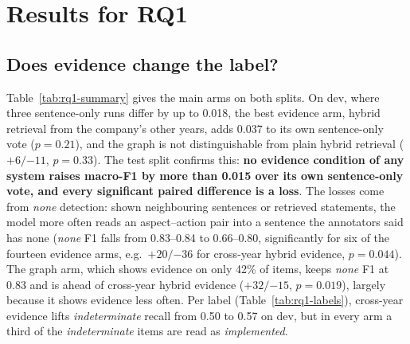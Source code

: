 \documentclass[11pt]{article}
\begin{document}
\section{Results for RQ1}
\label{sec:rq1}

\subsection{Does evidence change the label?}
\label{sec:rq1-main}
\label{sec:rq1-test}
Table~\ref{tab:rq1-summary} gives the main arms on both splits. On dev, where three sentence-only runs differ by up to 0.018, the best evidence arm, hybrid retrieval from the company's other years, adds 0.037 to its own sentence-only vote ($p = 0.21$), and the graph is not distinguishable from plain hybrid retrieval ($+6 / {-11}$, $p = 0.33$). The test split confirms this: \textbf{no evidence condition of any system raises macro-F1 by more than 0.015 over its own sentence-only vote, and every significant paired difference is a loss}. The losses come from \emph{none} detection: shown neighbouring sentences or retrieved statements, the model more often reads an aspect--action pair into a sentence the annotators said has none (\emph{none} F1 falls from 0.83--0.84 to 0.66--0.80, significantly for six of the fourteen evidence arms, e.g.\ $+20 / {-36}$ for cross-year hybrid evidence, $p = 0.044$). The graph arm, which shows evidence on only 42\% of items, keeps \emph{none} F1 at 0.83 and is ahead of cross-year hybrid evidence ($+32 / {-15}$, $p = 0.019$), largely because it shows evidence less often. Per label (Table~\ref{tab:rq1-labels}), cross-year evidence lifts \emph{indeterminate} recall from 0.50 to 0.57 on dev, but in every arm a third of the \emph{indeterminate} items are read as \emph{implemented}.
\end{document}
